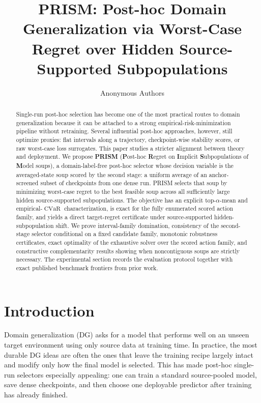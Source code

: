 \documentclass{article}
\title{PRISM: Post-hoc Domain Generalization via Worst-Case Regret over Hidden Source-Supported Subpopulations}
\author{Anonymous Authors}
\newcommand{\CVaR}{\operatorname{CVaR}}
\newcommand{\prism}{\textup{\textsc{PRISM}}}
\newcommand{\1}{\mathbbm{1}}
\begin{document}
\maketitle

\begin{abstract}
Single-run post-hoc selection has become one of the most practical routes to domain generalization because it can be attached to a strong empirical-risk-minimization pipeline without retraining. Several influential post-hoc approaches, however, still optimize proxies: flat intervals along a trajectory, checkpoint-wise stability scores, or raw worst-case loss surrogates. This paper studies a stricter alignment between theory and deployment. We propose \textbf{\prism{}} (\textbf{P}ost-hoc \textbf{R}egret on \textbf{I}mplicit \textbf{S}ubpopulations of \textbf{M}odel soups), a domain-label-free post-hoc selector whose decision variable is the averaged-state soup scored by the second stage: a uniform average of an anchor-screened subset of checkpoints from one dense run. \prism{} selects that soup by minimizing worst-case regret to the best feasible soup across all sufficiently large hidden source-supported subpopulations. The objective has an explicit top-$\alpha$-mean and empirical-\(\CVaR\) characterization, is exact for the fully enumerated scored action family, and yields a direct target-regret certificate under source-supported hidden-subpopulation shift. We prove interval-family domination, consistency of the second-stage selector conditional on a fixed candidate family, monotonic robustness certificates, exact optimality of the exhaustive solver over the scored action family, and constructive complementarity results showing when noncontiguous soups are strictly necessary. The experimental section records the evaluation protocol together with exact published benchmark frontiers from prior work.
\end{abstract}

\section{Introduction}

Domain generalization (DG) asks for a model that performs well on an unseen target environment using only source data at training time. In practice, the most durable DG ideas are often the ones that leave the training recipe largely intact and modify only how the final model is selected. This has made post-hoc single-run selectors especially appealing: one can train a standard source-pooled model, save dense checkpoints, and then choose one deployable predictor after training has already finished.
\end{document}
